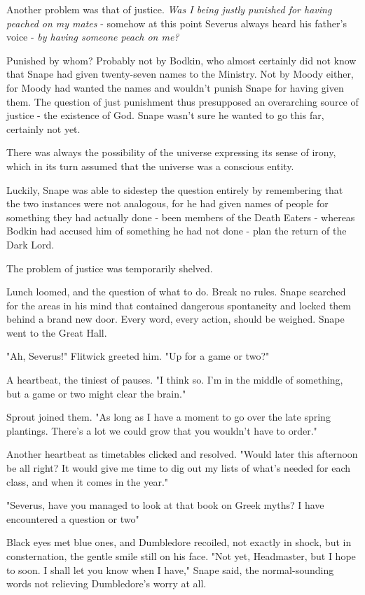 Another problem was that of justice. \emph{Was I being justly punished for having peached on my mates} - somehow at this point Severus always heard his father's voice - \emph{by having someone peach on me?}

Punished by whom? Probably not by Bodkin, who almost certainly did not know that Snape had given twenty-seven names to the Ministry. Not by Moody either, for Moody had wanted the names and wouldn't punish Snape for having given them. The question of just punishment thus presupposed an overarching source of justice - the existence of God. Snape wasn't sure he wanted to go this far, certainly not yet.

There was always the possibility of the universe expressing its sense of irony, which in its turn assumed that the universe was a conscious entity.

Luckily, Snape was able to sidestep the question entirely by remembering that the two instances were not analogous, for he had given names of people for something they had actually done - been members of the Death Eaters - whereas Bodkin had accused him of something he had not done - plan the return of the Dark Lord.

The problem of justice was temporarily shelved.

Lunch loomed, and the question of what to do. Break no rules. Snape searched for the areas in his mind that contained dangerous spontaneity and locked them behind a brand new door. Every word, every action, should be weighed. Snape went to the Great Hall.

"Ah, Severus!" Flitwick greeted him. "Up for a game or two?"

A heartbeat, the tiniest of pauses. "I think so. I'm in the middle of something, but a game or two might clear the brain."

Sprout joined them. "As long as I have a moment to go over the late spring plantings. There's a lot we could grow that you wouldn't have to order."

Another heartbeat as timetables clicked and resolved. "Would later this afternoon be all right? It would give me time to dig out my lists of what's needed for each class, and when it comes in the year."

"Severus, have you managed to look at that book on Greek myths? I have encountered a question or two{\el}"

Black eyes met blue ones, and Dumbledore recoiled, not exactly in shock, but in consternation, the gentle smile still on his face. "Not yet, Headmaster, but I hope to soon. I shall let you know when I have," Snape said, the normal-sounding words not relieving Dumbledore's worry at all.

